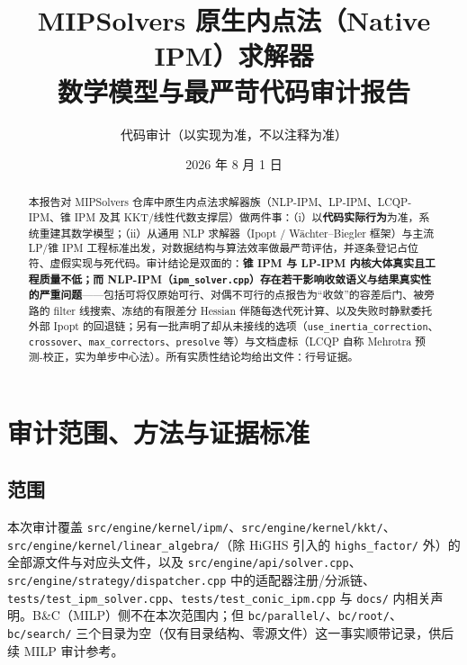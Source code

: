 \documentclass[11pt,a4paper]{ctexart}
\title{\textbf{MIPSolvers 原生内点法（Native IPM）求解器\\数学模型与最严苛代码审计报告}}
\author{代码审计（以实现为准，不以注释为准）}
\date{2026 年 8 月 1 日}
\newcommand{\file}[1]{\texttt{#1}}
\newcommand{\opt}[1]{\texttt{#1}}
\begin{document}
\maketitle

\begin{abstract}
\noindent 本报告对 MIPSolvers 仓库中原生内点法求解器族（NLP-IPM、LP-IPM、LCQP-IPM、锥 IPM 及其 KKT/线性代数支撑层）做两件事：（i）以\textbf{代码实际行为}为准，系统重建其数学模型；（ii）从通用 NLP 求解器（Ipopt / Wächter--Biegler 框架）与主流 LP/锥 IPM 工程标准出发，对数据结构与算法效率做最严苛评估，并逐条登记占位符、虚假实现与死代码。审计结论是双面的：\textbf{锥 IPM 与 LP-IPM 内核大体真实且工程质量不低；而 NLP-IPM（\file{ipm\_solver.cpp}）存在若干影响收敛语义与结果真实性的严重问题}——包括可将仅原始可行、对偶不可行的点报告为``收敛''的容差后门、被旁路的 filter 线搜索、冻结的有限差分 Hessian 伴随每迭代死计算、以及失败时静默委托外部 Ipopt 的回退链；另有一批声明了却从未接线的选项（\opt{use\_inertia\_correction}、\opt{crossover}、\opt{max\_correctors}、\opt{presolve} 等）与文档虚标（LCQP 自称 Mehrotra 预测-校正，实为单步中心法）。所有实质性结论均给出文件：行号证据。
\end{abstract}

\tableofcontents
\newpage

\section{审计范围、方法与证据标准}

\subsection{范围}
本次审计覆盖 \file{src/engine/kernel/ipm/}、\file{src/engine/kernel/kkt/}、\file{src/engine/kernel/linear\_algebra/}（除 HiGHS 引入的 \file{highs\_factor/} 外）的全部源文件与对应头文件，以及 \file{src/engine/api/solver.cpp}、\file{src/engine/strategy/dispatcher.cpp} 中的适配器注册/分派链、\file{tests/test\_ipm\_solver.cpp}、\file{tests/test\_conic\_ipm.cpp} 与 \file{docs/} 内相关声明。B\&C（MILP）侧不在本次范围内；但 \file{bc/parallel/}、\file{bc/root/}、\file{bc/search/} 三个目录为空（仅有目录结构、零源文件）这一事实顺带记录，供后续 MILP 审计参考。
\end{document}
